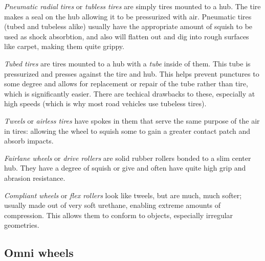 \documentclass[10pt,letterpaper]{book}
\begin{document}
	\begin{asparaenum}[a)]
		\item \textit{Pneumatic radial tires} or \textit{tubless tires} are simply tires mounted to a hub. The tire makes a seal on the hub allowing it to be pressurized with air. Pneumatic tires (tubed and tubeless alike) usually have the appropriate amount of squish to be used as shock absorbtion, and also will flatten out and dig into rough surfaces like carpet, making them quite grippy.
		\item \textit{Tubed tires} are tires mounted to a hub with a \textit{tube} inside of them. This tube is pressurized and presses against the tire and hub. This helps prevent punctures to some degree and allows for replacement or repair of the tube rather than tire, which is significantly easier. There are techical drawbacks to these, especially at high speeds (which is why most road vehicles use tubeless tires).	
		\item \textit{Tweels} or \textit{airless tires} have spokes in them that serve the same purpose of the air in tires: allowing the wheel to squish some to gain a greater contact patch and absorb impacts.
		\item \textit{Fairlane wheels} or \textit{drive rollers} are solid rubber rollers bonded to a slim center hub. They have a degree of squish or give and often have quite high grip and abrasion resistance.
		\item \textit{Compliant wheels} or \textit{flex rollers} look like tweels, but are much, much softer; usually made out of very soft urethane, enabling extreme amounts of compression. This allows them to conform to objects, especially irregular geometries.
	\end{asparaenum}
	
	\subsection{Omni wheels}
	
\end{document}
